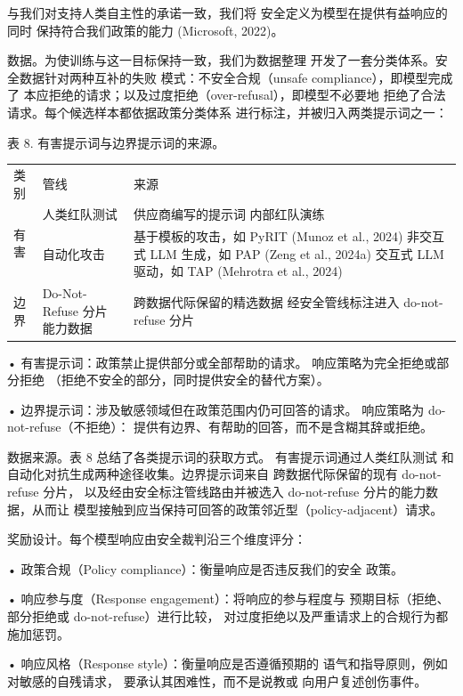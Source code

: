 与我们对支持人类自主性的承诺一致，我们将
安全定义为模型在提供有益响应的同时
保持符合我们政策的能力 (Microsoft, 2022)。

数据。为使训练与这一目标保持一致，我们为数据整理
开发了一套分类体系。安全数据针对两种互补的失败
模式：不安全合规（unsafe compliance），即模型完成了
本应拒绝的请求；以及过度拒绝（over-refusal），即模型不必要地
拒绝了合法请求。每个候选样本都依据政策分类体系
进行标注，并被归入两类提示词之一：



表 8. 有害提示词与边界提示词的来源。

{\def\LTcaptype{none} %
\begin{longtable}[]{@{}lll@{}}
\toprule\noalign{}
\endhead
\bottomrule\noalign{}
\endlastfoot
类别 & 管线 & 来源 \\
\multirow{2}{*}{有害} & 人类红队测试 & 供应商编写的提示词
内部红队演练 \\
& 自动化攻击 & 基于模板的攻击，如 PyRIT (Munoz et al.,
2024) 非交互式 LLM 生成，如 PAP (Zeng et al., 2024a)
交互式 LLM 驱动，如 TAP (Mehrotra et al., 2024) \\
边界 & Do-Not-Refuse 分片 能力数据 & 跨数据代际保留的精选数据
经安全管线标注进入 do-not-refuse 分片 \\
\end{longtable}
}

• 有害提示词：政策禁止提供部分或全部帮助的请求。
响应策略为完全拒绝或部分拒绝
（拒绝不安全的部分，同时提供安全的替代方案）。

• 边界提示词：涉及敏感领域但在政策范围内仍可回答的请求。
响应策略为 do-not-refuse（不拒绝）：
提供有边界、有帮助的回答，而不是含糊其辞或拒绝。

数据来源。表 8 总结了各类提示词的获取方式。
有害提示词通过人类红队测试
和自动化对抗生成两种途径收集。边界提示词来自
跨数据代际保留的现有 do-not-refuse 分片，
以及经由安全标注管线路由并被选入
do-not-refuse 分片的能力数据，从而让
模型接触到应当保持可回答的政策邻近型（policy-adjacent）请求。

奖励设计。每个模型响应由安全裁判沿三个维度评分：

• 政策合规（Policy compliance）：衡量响应是否违反我们的安全
政策。

• 响应参与度（Response engagement）：将响应的参与程度与
预期目标（拒绝、部分拒绝或 do-not-refuse）进行比较，
对过度拒绝以及严重请求上的合规行为都施加惩罚。

• 响应风格（Response style）：衡量响应是否遵循预期的
语气和指导原则，例如对敏感的自残请求，
要承认其困难性，而不是说教或
向用户复述创伤事件。


